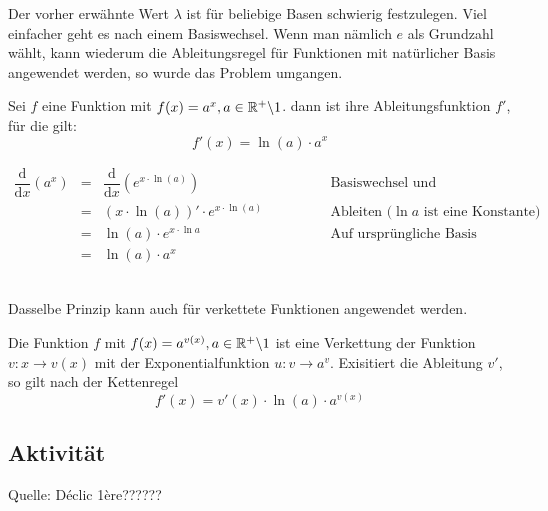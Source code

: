 Der vorher erwähnte Wert $\lambda$ ist für beliebige Basen schwierig festzulegen. Viel einfacher geht es nach einem Basiswechsel. Wenn man nämlich $e$ als Grundzahl wählt, kann wiederum die Ableitungsregel für Funktionen mit natürlicher Basis angewendet werden, so wurde das Problem umgangen.\\


\begin{Theorem}
Sei $f$ eine Funktion mit $f(x)=a^x,a\in\R^+\backslash1$. dann ist ihre Ableitungsfunktion $f'$, für die gilt:
$$f'(x)=\ln (a)\cdot a^x$$
\end{Theorem}
\begin{Beweis}
\begin{center}
$\begin{array}{ccll}
\dfrac{\text{d}}{\text{d}x}(a^x) &=&\dfrac{\text{d}}{\text{d}x}(e^{x\cdot\ln (a)})&\text{Basiswechsel und Kettenregel anwenden}\\
&=&(x\cdot\ln (a))'\cdot e^{x\cdot\ln (a)}\qquad\qquad&\text{Ableiten (}\ln a\text{ ist eine Konstante)}\\
&=&\ln (a) \cdot e^{x\cdot \ln a}&\text{Auf ursprüngliche Basis bringen}\\
&=&\ln (a)\cdot a^x&
\end{array}$
\end{center}
\end{Beweis}
\\
Dasselbe Prinzip kann auch für verkettete Funktionen angewendet werden.
\begin{Theorem}
Die Funktion $f$ mit $f(x)=a^{v(x)},a\in\R^+\backslash1$ ist eine Verkettung der Funktion $v:x\rightarrow v(x)$ mit der Exponentialfunktion $u: v \rightarrow a^v$. Exisitiert die Ableitung $v'$, so gilt nach der Kettenregel\\
$$f'(x)=v'(x)\cdot\ln (a)\cdot a^{v(x)}$$
\end{Theorem}
\begin{Beweis}
$\begin{array}{ccll}
\dfrac{\text{d}}{\text{d}x}(a^{v(x)}) &=&\dfrac{\text{d}}{\text{d}x}(e^{v(x)\cdot\ln (a)})&\text{Basiswechsel und Kettenregel anwenden}\\
&=&(v(x)\cdot\ln (a)})'\cdot e^{v(x)\cdot\ln (a)}\qquad\qquad&\text{Ableiten (}\ln a\text{ ist eine Konstante)}\\
&=&v'(x)\cdot\ln (a) \cdot e^{v(x)\cdot \ln a}&\text{Auf ursprüngliche Basis bringen}\\
&=&v'(x)\cdot\ln (a)\cdot a^{v(x)}&
\end{array}$
\end{Beweis}
	\subsection{Aktivität}

Quelle: Déclic 1ère??????